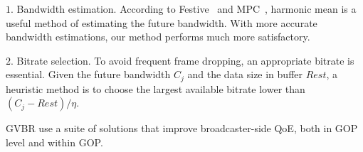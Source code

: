 $1.$ Bandwidth estimation. According to Festive~\cite{jiang2014improving} and MPC~\cite{yin2015control}, harmonic mean is a useful method of estimating the future bandwidth. With more accurate bandwidth estimations, our method performs much more satisfactory.

$2.$ Bitrate selection. To avoid frequent frame dropping, an appropriate bitrate is essential. Given the future bandwidth $C_j$ and the data size in buffer $Rest$, a heuristic method is to choose the largest available bitrate lower than $(C_j-Rest)/\eta$.

GVBR use a suite of solutions that improve broadcaster-side QoE, both in GOP level and within GOP. 